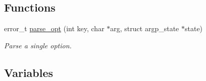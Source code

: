 \subsection*{Functions}
\begin{DoxyCompactItemize}
\item 
error\+\_\+t \hyperlink{arg-info_8h_a5fb6abc38ef248ec154591e0dd392c1b}{parse\+\_\+opt} (int key, char $\ast$arg, struct argp\+\_\+state $\ast$state)
\begin{DoxyCompactList}\small\item\em Parse a single option. \end{DoxyCompactList}\end{DoxyCompactItemize}
\subsection*{Variables}
